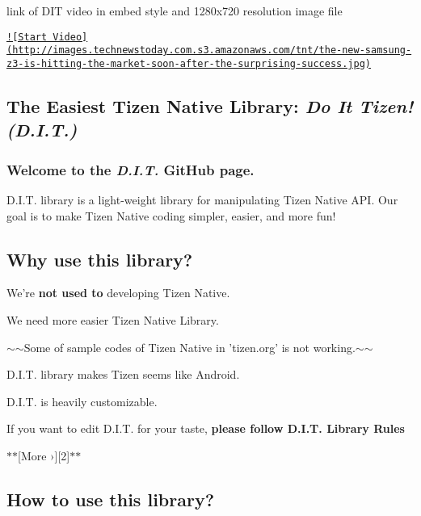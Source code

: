 link of D\-I\-T video in embed style and 1280x720 resolution image file

\href{https://www.youtube.com/embed/MBfxQIz80Jk}{\tt !\mbox{[}Start Video\mbox{]}(http\-://images.\-technewstoday.\-com.\-s3.\-amazonaws.\-com/tnt/the-\/new-\/samsung-\/z3-\/is-\/hitting-\/the-\/market-\/soon-\/after-\/the-\/surprising-\/success.\-jpg)}

\subsection*{The Easiest Tizen Native Library\-: {\itshape Do It Tizen! (D.\-I.\-T.)}}

\subsubsection*{Welcome to the {\itshape D.\-I.\-T.} Git\-Hub page.}

D.\-I.\-T. library is a light-\/weight library for manipulating Tizen Native A\-P\-I. Our goal is to make Tizen Native coding simpler, easier, and more fun!

\subsection*{Why use this library?}


\begin{DoxyEnumerate}
\item We're {\bfseries not used to} developing Tizen Native.
\item We need more easier Tizen Native Library.
\item $\sim$$\sim$\-Some of sample codes of Tizen Native in 'tizen.\-org' is not working.$\sim$$\sim$
\item D.\-I.\-T. library makes Tizen seems like Android.
\item D.\-I.\-T. is heavily customizable.
\begin{DoxyItemize}
\item If you want to edit D.\-I.\-T. for your taste, {\bfseries please follow D.\-I.\-T. Library Rules}
\end{DoxyItemize}
\end{DoxyEnumerate}

$\ast$$\ast$\mbox{[}More ›\mbox{]}\mbox{[}2\mbox{]}$\ast$$\ast$

\subsection*{How to use this library?}


